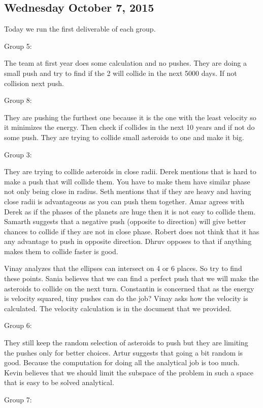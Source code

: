 \subsection{Wednesday October 7, 2015}
Today we run the first deliverable of each group.

Group 5:

The team at first year does some calculation and no pushes. They are doing a small push and try to find if the 2 will collide in the next 5000 days. If not collision next push.

Group 8:

They are pushing the furthest one because it is the one with the least velocity so it minimizes the energy. Then check if collides in the next 10 years and if not do some push. They are trying to collide small asteroids to one and make it big.

Group 3:

They are trying to collide asteroids in close radii. 
Derek mentions that is hard to make a push that will collide them. You have to make them have similar phase not only being close in radius.
Seth mentions that if they are heavy and having close radii is advantageous as you can push them together. 
Amar agrees with Derek as if the phases of the planets are huge then it is not easy to collide them.
Samarth suggests that a negative push (opposite to direction) will give better chances to collide if they are not in close phase.
Robert does not think that it has any advantage to push in opposite direction.
Dhruv opposes to that if anything makes them to collide faster is good.

Vinay analyzes that the ellipses can intersect on 4 or 6 places. So try to find these points.
Sania believes that we can find a perfect push that we will make the asteroids to collide on the next turn. 
Constantin is concerned that as the energy is velocity squared, tiny pushes can do the job?
Vinay asks how the velocity is calculated. The velocity calculation is in the document that we provided.

Group 6:

They still keep the random selection of asteroids to push but they are limiting the pushes only for better choices.  
Artur suggests that going a bit random is good. Because the computation for doing all the analytical job is too much.
Kevin believes that we should limit the subspace of the problem in such a space that is easy to be solved analytical. 

Group 7:

